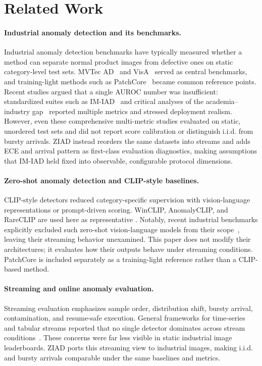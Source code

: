 \documentclass[runningheads]{llncs}
\begin{document}
\section{Related Work}
\paragraph{Industrial anomaly detection and its benchmarks.}
Industrial anomaly detection benchmarks have typically measured whether a method
can separate normal product images from defective ones on static category-level
test sets. MVTec AD~\cite{Bergmann2019MVTec} and VisA~\cite{Zou2022VisA} served
as central benchmarks, and training-light methods such as
PatchCore~\cite{Roth2022PatchCore} became common reference points. Recent studies
argued that a single AUROC number was insufficient: standardized suites such as
IM-IAD~\cite{Xie2024IMIAD} and critical analyses of the academia--industry
gap~\cite{Baitieva2025Beyond} reported multiple metrics and stressed deployment
realism. However, even these comprehensive multi-metric studies evaluated on
static, unordered test sets and did not report score calibration or distinguish
i.i.d. from bursty arrivals. ZIAD instead reorders the same datasets into streams
and adds ECE and arrival pattern as first-class evaluation diagnostics, making
assumptions that IM-IAD held fixed into observable, configurable protocol
dimensions.

\paragraph{Zero-shot anomaly detection and CLIP-style baselines.}
CLIP-style detectors reduced category-specific supervision with
vision-language representations or prompt-driven scoring. WinCLIP,
AnomalyCLIP, and RareCLIP are used here as representative
\cite{Jeong2023WinCLIP,Zhou2024AnomalyCLIP,He2025RareCLIP}. Notably, recent
industrial benchmarks explicitly excluded such zero-shot vision-language models
from their scope~\cite{Baitieva2025Beyond}, leaving their streaming behavior
unexamined. This paper does not modify their architectures; it evaluates how
their outputs behave under streaming conditions. PatchCore is included separately
as a training-light reference rather than a CLIP-based method.

\paragraph{Streaming and online anomaly evaluation.}
Streaming evaluation emphasizes sample order, distribution shift, bursty arrival,
contamination, and resume-safe execution. General frameworks for time-series and
tabular streams reported that no single detector dominates across stream
conditions~\cite{Calikus2020NoFreeLunch,Chandola2009AnomalyDetection,Bifet2010MOA}.
These concerns were far less visible in static industrial image leaderboards. ZIAD
ports this streaming view to industrial images, making i.i.d. and bursty arrivals
comparable under the same baselines and metrics.
\end{document}
